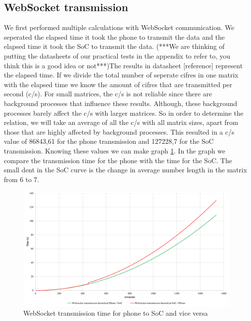 \documentclass[a4paper, 11pt]{report}
\begin{document}
\subsection{WebSocket transmission}
We first performed multiple calculations with WebSocket communication. We seperated the elapsed time it took the phone to transmit the data and the elapsed time it took the SoC to transmit the data. (***We are thinking of putting the datasheets of our practical tests in the appendix to refer to, you think this is a good idea or not***)The results in datasheet [reference] represent the elapsed time. If we divide the total number of seperate cifres in one matrix with the elapsed time we know the amount of cifres that are transmitted per second (c/s). For small matrices, the c/s is not reliable since there are background processes that influence these results. Although, these background processes barely affect the c/s with larger matrices. So in order to determine the relation, we will take an average of all the c/s with all matrix sizes, apart from those that are highly affected by background processes. This resulted in a c/s value of 86843,61 for the phone transmission and 127228,7 for the SoC transmission. Knowing these values we can make graph \ref{graph:websocketTime}. In the graph we compare the transmission time for the phone with the time for the SoC. The small dent in 
the SoC curve is the change in average number length in the matrix from 6 to 7.
\begin{figure}[ht]
\centering
\includegraphics[scale=0.45]{images/WebsocketTransmissionSpeed.pdf}
\caption{WebSocket transmission time for phone to SoC and vice versa}\label{graph:websocketTime}
\end{figure}
\end{document}
